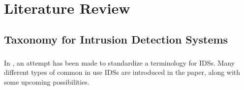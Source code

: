 \chapter{Literature Review}
\label{ch:LR}
\section{Taxonomy for Intrusion Detection Systems}

\paragraph{}
In \cite{ids_taxonomy}, an attempt has been made to standardize a terminology for IDSs. Many different types of common in use IDSs are introduced in the paper, along with some upcoming possibilities.

